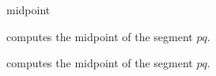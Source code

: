 \begin{ccRefFunction}{midpoint}

 {computes the midpoint of the segment $pq$.}

 {computes the midpoint of the segment $pq$.}
\end{ccRefFunction}

